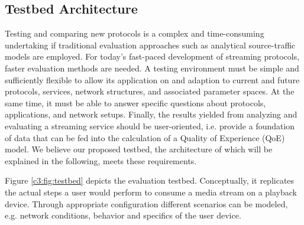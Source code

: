 \subsection{Testbed Architecture}

Testing and comparing new protocols is a complex and time-consuming undertaking if traditional evaluation approaches such as analytical source-traffic models are employed. For today's fast-paced development of streaming protocols, faster evaluation methods are needed. A testing environment must be simple and sufficiently flexible to allow its application on and adaption to current and future protocols, services, network structures, and associated parameter spaces. 
At the same time, it must be able to answer specific questions about  protocols, applications, and network setups. Finally, the results yielded from analyzing and evaluating a streaming service should be user-oriented, i.e. provide a foundation of data that can be fed into the calculation of a Quality of Experience (QoE) model. We believe our proposed testbed, the architecture of which will be explained in the following, meets these requirements.



Figure \ref{c3:fig:testbed} depicts the evaluation testbed. %
Conceptually, it replicates the actual steps a user would perform to consume a media stream on a playback device. Through appropriate configuration different scenarios can be modeled, e.g. network conditions, behavior and specifics of the user device.
 
